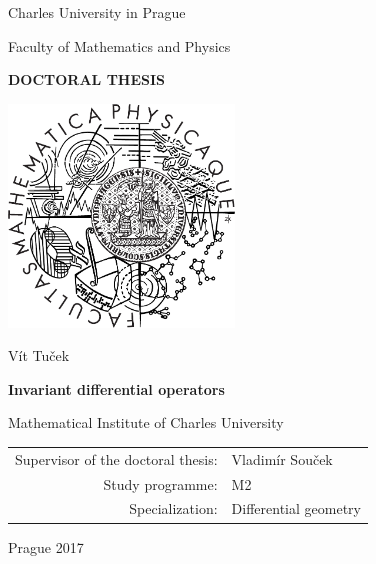 
\pagestyle{empty}
\begin{center}

\large

Charles University in Prague

\medskip

Faculty of Mathematics and Physics

\vfill

{\bf\Large DOCTORAL THESIS}

\vfill

\centerline{\mbox{\includegraphics[width=60mm]{logo}}}

\vfill
\vspace{5mm}

{\LARGE Vít Tuček}

\vspace{15mm}

{\LARGE\bfseries Invariant differential operators}

\vfill

Mathematical Institute of Charles University

\vfill

\begin{tabular}{rl}

Supervisor of the doctoral thesis: & Vladimír Souček \\
\noalign{\vspace{2mm}}
Study programme: & M2 \\	%
\noalign{\vspace{2mm}}
Specialization: & Differential geometry \\
\end{tabular}

\vfill

Prague 2017

\end{center}

